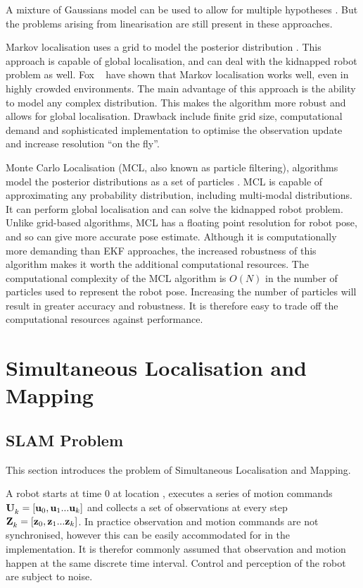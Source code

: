 A mixture of Gaussians model can be used to allow for multiple
hypotheses \cite{JensfeltKristensen01,Cox94}. But the problems arising
from linearisation are still present in these approaches.

Markov localisation uses a grid to model the posterior distribution
\cite{Fox99}. This approach is capable of global localisation, and can
deal with the kidnapped robot problem as well. Fox \etal\ \cite{fb99}
have shown that Markov localisation works well, even in highly crowded
environments. The main advantage of this approach is the ability to
model any complex distribution. This makes the algorithm more robust
and allows for global localisation. Drawback include finite grid size,
computational demand and sophisticated implementation to optimise the
observation update and increase resolution ``on the fly''.

Monte Carlo Localisation (MCL, also known as particle filtering),
algorithms model the posterior distributions as a set of particles
\cite{Thrun00j, JensfeltAustinWijk00b}. MCL is capable of
approximating any probability distribution, including multi-modal
distributions. It can perform global localisation and can solve the
kidnapped robot problem. Unlike grid-based algorithms, MCL has a
floating point resolution for robot pose, and so can give more
accurate pose estimate. Although it is computationally more demanding
than EKF approaches, the increased robustness of this algorithm makes
it worth the additional computational resources. The computational
complexity of the MCL algorithm is $O(N)$ in the number of particles
used to represent the robot pose. Increasing the number of particles
will result in greater accuracy and robustness. It is therefore easy
to trade off the computational resources against performance.

\section{Simultaneous Localisation and Mapping}
\label{sec:SLAM}

\subsection{SLAM Problem}

This section introduces the problem of Simultaneous Localisation and
Mapping.

A robot starts at time 0 at location , executes a series of
motion commands ${\bf U}^{}_{k} = [{\bf u}_{0},{\bf u}_{1}...{\bf u}_{k}]$ and collects a
set of observations at every step
${\bf Z}^{}_{k}=[{\bf z}_{0},{\bf z}_{1}...{\bf z}_{k}]$. In practice observation and motion
commands are not synchronised, however this can be easily accommodated
for in the implementation. It is therefor commonly assumed that
observation and motion happen at the same discrete time interval.
Control and perception of the robot are subject to noise.

